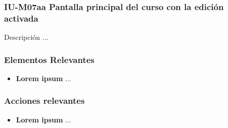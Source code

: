 
\subsubsection{IU-M07aa Pantalla principal del curso con la edición activada}

 Descripción ...


\subsubsection{Elementos Relevantes}

    \begin{itemize}
    \item {\bf Lorem ipsum}
        ...
    \end{itemize}

\subsubsection{Acciones relevantes}

    \begin{itemize}
    \item {\bf Lorem ipsum}
        ...
    \end{itemize}

\clearpage

